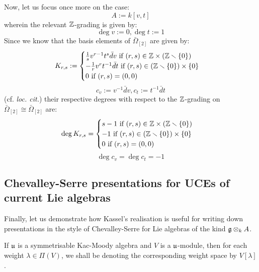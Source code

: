 \begin{remark}
            Now, let us focus once more on the case:
                $$A := k[v, t]$$
            wherein the relevant $\mathbb{Z}$-grading is given by:
                $$\deg v := 0, \deg t := 1$$
            Since we know that the basis elements of $\bar{\Omega}_{[2]}$ are given by:
                $$
                    K_{r, s} :=
                    \begin{cases}
                        \text{$\frac1s v^{r - 1} t^s \bar{d}v$ if $(r, s) \in \Z \x (\Z \setminus \{0\})$}
                        \\
                        \text{$-\frac1r v^r t^{-1} \bar{d}t$ if $(r, s) \in (\Z \setminus \{0\}) \x \{0\}$}
                        \\
                        \text{$0$ if $(r, s) = (0, 0)$}
                    \end{cases}
                $$
                $$c_v := v^{-1} \bar{d}v, c_t := t^{-1} \bar{d}t$$
            (cf. \textit{loc. cit.}) their respective degrees with respect to the $\mathbb{Z}$-grading on $\bar{\Omega}_{[2]} \cong \bar{\Omega}_{[2]}$ are:
                $$
                    \deg K_{r, s} =
                    \begin{cases}
                        \text{$s - 1$ if $(r, s) \in \Z \x (\Z \setminus \{0\})$}
                        \\
                        \text{$-1$ if $(r, s) \in (\Z \setminus \{0\}) \x \{0\}$}
                        \\
                        \text{$0$ if $(r, s) = (0, 0)$}
                    \end{cases}
                $$
                $$\deg c_v = \deg c_t = -1$$
        \end{remark}

    \subsection{Chevalley-Serre presentations for UCEs of current Lie algebras}
        Finally, let us demonstrate how Kassel's realisation is useful for writing down presentations in the style of Chevalley-Serre for Lie algebras of the kind $\g \tensor_k A$.

        \begin{convention}
            If $\mathfrak{u}$ is a symmetrisable Kac-Moody algebra and $V$ is a $\mathfrak{u}$-module, then for each weight $\lambda \in \Pi(V)$, we shall be denoting the corresponding weight space by $V[\lambda]$.
        \end{convention}

